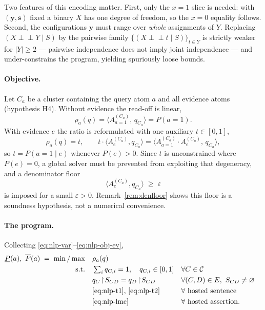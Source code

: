 \documentclass[11pt]{article}
\theoremstyle{definition}
\newcommand{\lo}{\underline}
\newcommand{\hi}{\overline}
\newcommand{\indep}{\perp\!\!\!\perp}
\newcommand{\restr}{\!\restriction\!}
\newcommand{\readoff}{\rho}
\begin{document}
Two features of this encoding matter. First, only the $x{=}1$ slice is needed:
with $(\mathbf y,\mathbf s)$ fixed a binary $X$ has one degree of freedom, so the
$x{=}0$ equality follows. Second, the configurations $\mathbf y$ must range over
\emph{whole} assignments of $Y$. Replacing $(X\indep Y\mid S)$ by the pairwise
family $\{(X\indep t\mid S)\}_{t\in Y}$ is strictly weaker for $|Y|\ge2$ ---
pairwise independence does not imply joint independence --- and under-constrains
the program, yielding spuriously loose bounds.

\paragraph{Objective.}\label{sec:nlp-obj}
Let $C_a$ be a cluster containing the query atom $a$ and all evidence atoms
(hypothesis H4). Without evidence the read-off is linear,
\begin{equation}\label{eq:nlp-obj}
  \readoff_a(q)=\bigl\langle A^{(C_a)}_{a=1},\,q_{C_a}\bigr\rangle=P(a{=}1).
\end{equation}
With evidence $e$ the ratio is reformulated with one auxiliary $t\in[0,1]$,
\begin{equation}\label{eq:nlp-obj-ev}
  \readoff_a(q)=t,\qquad
  t\cdot\bigl\langle A^{(C_a)}_{e},q_{C_a}\bigr\rangle
  =\bigl\langle A^{(C_a)}_{a=1}\!\cdot\!A^{(C_a)}_{e},\,q_{C_a}\bigr\rangle ,
\end{equation}
so $t=P(a{=}1\mid e)$ whenever $P(e)>0$. Since $t$ is unconstrained where
$P(e)=0$, a global solver must be prevented from exploiting that degeneracy, and a
denominator floor
\begin{equation}\label{eq:nlp-floor}
  \bigl\langle A^{(C_a)}_{e},q_{C_a}\bigr\rangle\;\ge\;\varepsilon
\end{equation}
is imposed for a small $\varepsilon>0$. Remark~\ref{rem:denfloor} shows this
floor is a soundness hypothesis, not a numerical convenience.

\paragraph{The program.}
Collecting \eqref{eq:nlp-var}--\eqref{eq:nlp-obj-ev},
\begin{equation}\label{eq:nlp-all}
\begin{aligned}
\lo P(a),\ \hi P(a)\;=\;\min/\max\quad &\readoff_a(q)\\
\text{s.t.}\quad
&\textstyle\sum_i q_{C,i}=1,\quad q_{C,i}\in[0,1] && \forall C\in\mathcal C\\
&q_C\restr S_{CD}=q_D\restr S_{CD} && \forall (C,D)\in E,\ S_{CD}\ne\varnothing\\
&\text{\eqref{eq:nlp-t1}, \eqref{eq:nlp-t2}} && \forall\text{ hosted sentence}\\
&\text{\eqref{eq:nlp-lmc}} && \forall\text{ hosted assertion.}
\end{aligned}
\end{equation}
\end{document}
